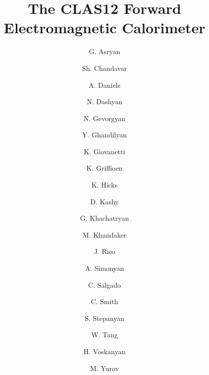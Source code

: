 \title{The CLAS12 Forward Electromagnetic Calorimeter}

\author[YerPi]{G. Asryan}
\author[Ohio]{Sh. Chandavar}
\author[Ohio]{A. Daniels}
\author[YerPi]{N. Dashyan}
\author[YerPi]{N. Gevorgyan}
\author[YerPi]{Y. Ghandilyan}
\author[JMU]{K. Giovanetti}
\author[WmM]{K. Griffioen}
\author[Ohio]{K. Hicks}
\author[JLAB] {D. Kashy}
\author[YerPi]{G. Khachatryan}
\author[NSU]{M. Khandaker}
\author[WmM]{J. Riso}
\author[YerPi]{A. Simonyan}
\author[NSU] {C. Salgado}
\author[UVA]{C. Smith}
\author[JLAB]{S. Stepanyan}
\author[Ohio]{W. Tang}
\author[YerPi]{H. Voskanyan}
\author[KPook] {M. Yurov}

\address[JLAB]{Thomas Jefferson National Accelerator Facility, 
Newport News, VA 23606, USA}
\address[WmM]{The College of William and Mary, Williamsburg, VA 23185, USA}
\address[Ohio]{Ohio University, Athens, OH 45701, USA} 
\address[NSU] {Norfolk State University, Norfolk, VA 23504, USA}
\address[UVA]{University of Virginia, Charlottesville, VA 22901, USA}
\address[YerPi]{A. Alikhanyan National Science Laboratory,  Yerevan, 375036, Armenia}
\address[JMU]{James Madison University, Harrisonburg, VA 22807 , USA}
\address[KPook]{Kyungpook National University, Korea}

